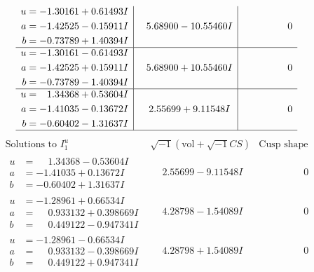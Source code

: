 \documentclass[1p]{elsarticle_modified}
\theoremstyle{definition}
\newcommand{\I}{\sqrt{-1}}
\begin{document}
$$\begin{array}{c|c|c}
\begin{aligned}
u &= -1.30161 + 0.61493 I \\
a &= -1.42525 - 0.15911 I \\
b &= -0.73789 + 1.40394 I\end{aligned}
 & \phantom{-}5.68900 - 10.55460 I & \phantom{-0.000000 } 0 \\ \hline\begin{aligned}
u &= -1.30161 - 0.61493 I \\
a &= -1.42525 + 0.15911 I \\
b &= -0.73789 - 1.40394 I\end{aligned}
 & \phantom{-}5.68900 + 10.55460 I & \phantom{-0.000000 } 0 \\ \hline\begin{aligned}
u &= \phantom{-}1.34368 + 0.53604 I \\
a &= -1.41035 - 0.13672 I \\
b &= -0.60402 - 1.31637 I\end{aligned}
 & \phantom{-}2.55699 + 9.11548 I & \phantom{-0.000000 } 0\\
 \hline 
 \end{array}$$\newpage$$\begin{array}{c|c|c}  
\text{Solutions to }I^u_{1}& \I (\text{vol} + \sqrt{-1}CS) & \text{Cusp shape}\\
 \hline 
\begin{aligned}
u &= \phantom{-}1.34368 - 0.53604 I \\
a &= -1.41035 + 0.13672 I \\
b &= -0.60402 + 1.31637 I\end{aligned}
 & \phantom{-}2.55699 - 9.11548 I & \phantom{-0.000000 } 0 \\ \hline\begin{aligned}
u &= -1.28961 + 0.66534 I \\
a &= \phantom{-}0.933132 + 0.398669 I \\
b &= \phantom{-}0.449122 - 0.947341 I\end{aligned}
 & \phantom{-}4.28798 - 1.54089 I & \phantom{-0.000000 } 0 \\ \hline\begin{aligned}
u &= -1.28961 - 0.66534 I \\
a &= \phantom{-}0.933132 - 0.398669 I \\
b &= \phantom{-}0.449122 + 0.947341 I\end{aligned}
 & \phantom{-}4.28798 + 1.54089 I & \phantom{-0.000000 } 0 \\ \hline\begin{aligned}

\end{aligned}
\end{array}$$
\end{document}
